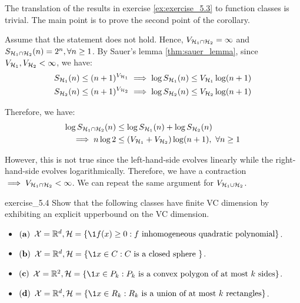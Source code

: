\begin{proof*}
    The translation of the results in exercise \ref{ex:exercise_5.3} to function classes is trivial. The main point is to prove the second point of the corollary. 
    
    \noindent\newline Assume that the statement does not hold. Hence, $V_{\mathcal{H}_1\cap\mathcal{H}_2}=\infty$ and $S_{\mathcal{H}_1\cap\mathcal{H}_2}(n) = 2^n, \forall n\ge1$. By Sauer's lemma \ref{thm:sauer_lemma}, since $V_{\mathcal{H}_1}, V_{\mathcal{H}_2} < \infty$, we have:
    \begin{align*}
        S_{\mathcal{H}_1}(n) &\le (n+1)^{V_{\mathcal{H}_1}} \implies \log S_{\mathcal{H}_1}(n) \le V_{\mathcal{H}_1}\log(n+1) \\
        S_{\mathcal{H}_2}(n) &\le (n+1)^{V_{\mathcal{H}_2}} \implies \log S_{\mathcal{H}_2}(n) \le V_{\mathcal{H}_2}\log(n+1)
    \end{align*} 

    \noindent Therefore, we have:
    \begin{align*}
        \log S_{\Hf_1\cap\Hf_2}(n) &\le \log S_{\Hf_1}(n) + \log S_{\Hf_2}(n) \\
        \implies n\log 2 &\le (V_{\Hf_1} + V_{\Hf_2})\log(n+1), \ \forall n\ge1
    \end{align*}

    \noindent However, this is not true since the left-hand-side evolves linearly while the right-hand-side evolves logarithmically. Therefore, we have a contraction $\implies V_{\mathcal{H}_1\cap\mathcal{H}_2} < \infty$. We can repeat the same argument for $V_{\mathcal{H}_1\cup\mathcal{H}_2}$.
\end{proof*}


\begin{exercise}{}{exercise_5.4}
    Show that the following classes have finite VC dimension by exhibiting an explicit upperbound on the VC dimension.
    \begin{itemize}
        \item ${\bf (a)}$ $\X=\R^d, \Hf=\{ \1{f(x)\ge0} : f \text{ inhomogeneous quadratic polynomial} \}$.
        \item ${\bf (b)}$ $\X=\R^d, \Hf=\{ \1{x \in C} : C \text{ is a closed sphere }\}$.
        \item ${\bf (c)}$ $\X=\R^2, \Hf=\{ \1{x \in P_k} : P_k \text{ is a convex polygon of at most $k$ sides} \}$.
        \item ${\bf (d)}$ $\X=\R^d, \Hf=\{ \1{x \in R_k} : R_k \text{ is a union of at most $k$ rectangles} \}$.
    \end{itemize}
\end{exercise}

